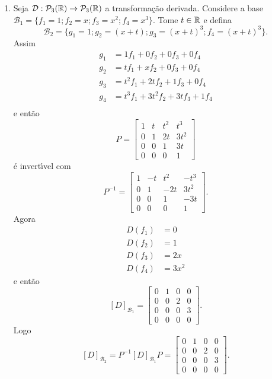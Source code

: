 \begin{exemplos}
\begin{enumerate}
		\item Seja $\mathcal{D} : \mathcal{P}_3(\mathbb{R}) \to \mathcal{P}_3(\mathbb{R})$ a transforma\c{c}\~ao derivada. Considere a base $\mathcal{B}_1 = \{f_1 = 1; f_2 = x; f_3 = x^2; f_4 = x^3\}$. Tome $t \in \mathbb{R}$ e defina
		\[
			\mathcal{B}_2 = \{g_1 = 1; g_2 = (x + t); g_3 = (x + t)^3; f_4 = (x + t)^3\}.
		\]
		Assim
		\begin{align*}
			g_1 &= 1f_1 + 0f_2 + 0f_3 + 0f_4\\
			g_2 &= tf_1 + xf_2 + 0f_3 + 0f_4\\
			g_3 &= t^2f_1 + 2tf_2 + 1f_3 + 0f_4\\
			g_4 &= t^3f_1 + 3t^2f_2 + 3tf_3 + 1f_4\\
		\end{align*}
		e ent\~ao
		\[
			P = \begin{bmatrix}
				1 & t & t^2 & t^3\\
				0 & 1 & 2t & 3t^2\\
				0 & 0 & 1 & 3t\\
				0 & 0 & 0 & 1
			\end{bmatrix}
		\]
		\'e invert{\'\i}vel com
		\[
			P^{-1} = \begin{bmatrix}
				1 & -t & t^2 & -t^3\\
				0 & 1 & -2t & 3t^2\\
				0 & 0 & 1 & -3t\\
				0 & 0 & 0 & 1
			\end{bmatrix}.
		\]
		Agora
		\begin{align*}
			D(f_1) &= 0\\
			D(f_2) &= 1\\
			D(f_3) &= 2x\\
			D(f_4) &= 3x^2
		\end{align*}
		e ent\~ao
		\[
			[D]_{\mathcal{B}_1} = \begin{bmatrix}
				0 & 1 & 0 & 0\\
				0 & 0 & 2 & 0\\
				0 & 0 & 0 & 3\\
				0 & 0 & 0 & 0
			\end{bmatrix}.
		\]
		Logo
		\[
			[D]_{\mathcal{B}_2} = P^{-1}[D]_{\mathcal{B}_1}P = \begin{bmatrix}
				0 & 1 & 0 & 0\\
				0 & 0 & 2 & 0\\
				0 & 0 & 0 & 3\\
				0 & 0 & 0 & 0
			\end{bmatrix}.
		\]
	\end{enumerate}
\end{exemplos}
